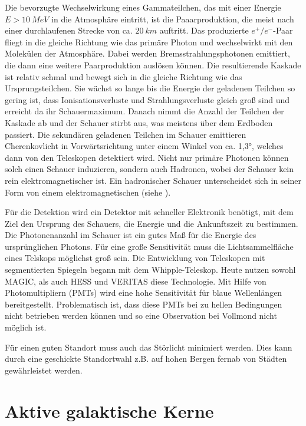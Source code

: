 Die bevorzugte Wechselwirkung eines Gammateilchen, das mit einer Energie $E>\SI{10}{MeV}$ in die Atmosphäre eintritt, ist die Paaarproduktion, die meist nach einer durchlaufenen Strecke von ca. $\SI{20}{km}$ auftritt.
Das produzierte $e^+/e^-$-Paar fliegt in die gleiche Richtung wie das primäre Photon und wechselwirkt mit den Molekülen der Atmosphäre.
Dabei werden Bremsstrahlungsphotonen emittiert, die dann eine weitere Paarproduktion auslösen können.
Die resultierende Kaskade ist relativ schmal und bewegt sich in die gleiche Richtung wie das Ursprungsteilchen.
Sie wächst so lange bis die Energie der geladenen Teilchen so gering ist, dass Ionisationsverluste und Strahlungsverluste gleich groß sind und erreicht da ihr Schauermaximum.
Danach nimmt die Anzahl der Teilchen der Kaskade ab und der Schauer stirbt aus, was meistens über dem Erdboden passiert.
Die sekundären geladenen Teilchen im Schauer emittieren Cherenkovlicht in Vorwärtsrichtung unter einem Winkel von ca. 1,3°, welches dann von den Teleskopen detektiert wird.
Nicht nur primäre Photonen können solch einen Schauer induzieren, sondern auch Hadronen, wobei der Schauer kein rein elektromagnetischer ist. 
Ein hadronischer Schauer unterscheidet sich in seiner Form von einem elektromagnetischen (siehe ).\cite{Weekes}

Für die Detektion wird ein Detektor mit schneller Elektronik benötigt, mit dem Ziel den Ursprung des Schauers, die Energie und die Ankunftszeit zu bestimmen.
Die Photonenanzahl im Schauer ist ein gutes Maß für die Energie des ursprünglichen Photons.
Für eine große Sensitivität muss die Lichtsammelfläche eines Telskops möglichst groß sein. 
Die Entwicklung von Teleskopen mit segmentierten Spiegeln begann mit dem Whipple-Teleskop\cite{Whipple}.
Heute nutzen sowohl MAGIC\cite{MAGIC_Telescopes}, als auch HESS\cite{HESS} und VERITAS\cite{VERITAS} diese Technologie.
Mit Hilfe von Photomultipliern (PMTs) wird eine hohe Sensitivität für blaue Wellenlängen bereitgestellt. 
Problematisch ist, dass diese PMTs bei zu hellen Bedingungen nicht betrieben werden können und so eine Observation bei Vollmond nicht möglich ist.\cite{Weekes}

Für einen guten Standort muss auch das Störlicht minimiert werden. 
Dies kann durch eine geschickte Standortwahl z.B. auf hohen Bergen fernab von Städten gewährleistet werden.


\section{Aktive galaktische Kerne}
\label{sec:AGN}

